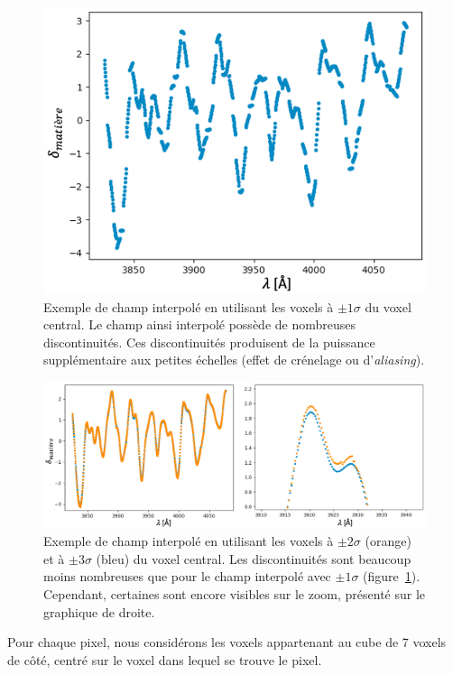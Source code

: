 \begin{figure}
  \centering
  \includegraphics[scale=0.5]{smoothing11}
  \caption{Exemple de champ interpolé en utilisant les voxels à $\pm 1 \sigma$ du voxel central. Le champ ainsi interpolé possède de nombreuses discontinuités. Ces discontinuités produisent de la puissance supplémentaire aux petites échelles (effet de crénelage ou d'\emph{aliasing}).}
  \label{fig:smoothing11}
\end{figure}
\begin{figure}
  \centering
  \includegraphics[scale=0.4]{smoothing23}
  \caption{Exemple de champ interpolé en utilisant les voxels à $\pm 2 \sigma$ (orange) et à $\pm 3 \sigma$ (bleu) du voxel central. Les discontinuités sont beaucoup moins nombreuses que pour le champ interpolé avec $\pm 1 \sigma$ (figure~\ref{fig:smoothing11}). Cependant, certaines sont encore visibles sur le zoom, présenté sur le graphique de droite.}
  \label{fig:smoothing23}
\end{figure}
Pour chaque pixel, nous considérons les voxels appartenant au cube de 7 voxels de côté, centré sur le voxel dans lequel se trouve le pixel. %
